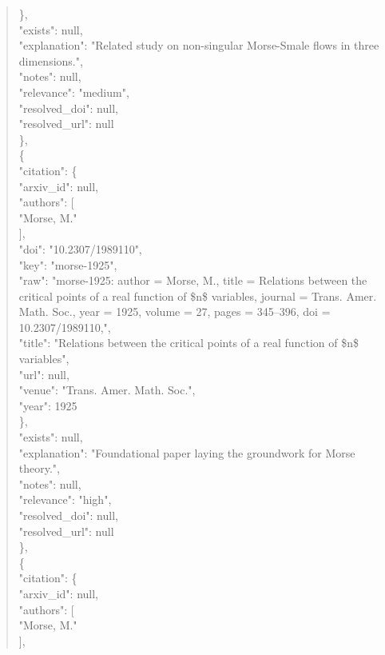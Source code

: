 \documentclass[11pt]{article}
\begin{document}
\begin{quote}
      \},\\
      "exists": null,\\
      "explanation": "Related study on non-singular Morse-Smale flows in three dimensions.",\\
      "notes": null,\\
      "relevance": "medium",\\
      "resolved\_doi": null,\\
      "resolved\_url": null\\
    \},\\
    \{\\
      "citation": \{\\
        "arxiv\_id": null,\\
        "authors": [\\
          "Morse, M."\\
        ],\\
        "doi": "10.2307/1989110",\\
        "key": "morse-1925",\\
        "raw": "morse-1925: author = Morse, M., title = Relations between the critical points of a real function of \$n\$ variables, journal = Trans. Amer. Math. Soc., year = 1925, volume = 27, pages = 345--396, doi = 10.2307/1989110,",\\
        "title": "Relations between the critical points of a real function of \$n\$ variables",\\
        "url": null,\\
        "venue": "Trans. Amer. Math. Soc.",\\
        "year": 1925\\
      \},\\
      "exists": null,\\
      "explanation": "Foundational paper laying the groundwork for Morse theory.",\\
      "notes": null,\\
      "relevance": "high",\\
      "resolved\_doi": null,\\
      "resolved\_url": null\\
    \},\\
    \{\\
      "citation": \{\\
        "arxiv\_id": null,\\
        "authors": [\\
          "Morse, M."\\
        ],\\

\end{quote}
\end{document}
